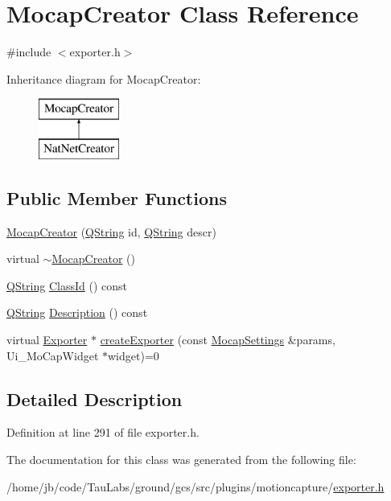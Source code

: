 \hypertarget{class_mocap_creator}{\section{\-Mocap\-Creator \-Class \-Reference}
\label{class_mocap_creator}
}


{\ttfamily \#include $<$exporter.\-h$>$}

\-Inheritance diagram for \-Mocap\-Creator\-:\begin{figure}[H]
\begin{center}
\leavevmode
\includegraphics[height=2.000000cm]{class_mocap_creator}
\end{center}
\end{figure}
\subsection*{\-Public \-Member \-Functions}
\begin{DoxyCompactItemize}
\item 
\hyperlink{group___mo_cap_plugin_ga90d59062e3d2c753e512451b60a977e8}{\-Mocap\-Creator} (\hyperlink{group___u_a_v_objects_plugin_gab9d252f49c333c94a72f97ce3105a32d}{\-Q\-String} id, \hyperlink{group___u_a_v_objects_plugin_gab9d252f49c333c94a72f97ce3105a32d}{\-Q\-String} descr)
\item 
virtual \hyperlink{group___mo_cap_plugin_ga934741ed7c6804f46b162987c2b9b5c8}{$\sim$\-Mocap\-Creator} ()
\item 
\hyperlink{group___u_a_v_objects_plugin_gab9d252f49c333c94a72f97ce3105a32d}{\-Q\-String} \hyperlink{group___mo_cap_plugin_ga775e3a65e804fbbeba1680da9b949286}{\-Class\-Id} () const 
\item 
\hyperlink{group___u_a_v_objects_plugin_gab9d252f49c333c94a72f97ce3105a32d}{\-Q\-String} \hyperlink{group___mo_cap_plugin_ga0eb79ab6540fef8926129b47aef0a2a8}{\-Description} () const 
\item 
virtual \hyperlink{class_exporter}{\-Exporter} $\ast$ \hyperlink{group___mo_cap_plugin_gaa300503bdf633291aeab43797cc61939}{create\-Exporter} (const \hyperlink{group___mo_cap_plugin_ga6083347a5b3eb70e360f599354dc0f0b}{\-Mocap\-Settings} \&params, \-Ui\-\_\-\-Mo\-Cap\-Widget $\ast$widget)=0
\end{DoxyCompactItemize}


\subsection{\-Detailed \-Description}


\-Definition at line 291 of file exporter.\-h.



\-The documentation for this class was generated from the following file\-:\begin{DoxyCompactItemize}
\item 
/home/jb/code/\-Tau\-Labs/ground/gcs/src/plugins/motioncapture/\hyperlink{exporter_8h}{exporter.\-h}\end{DoxyCompactItemize}
